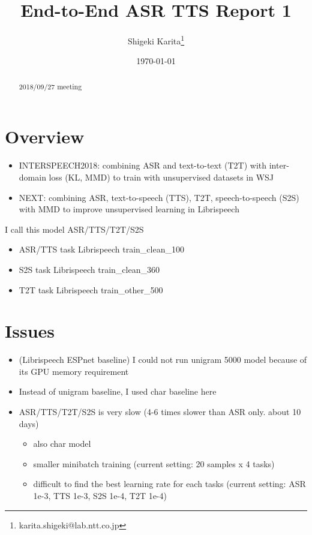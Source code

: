 \documentclass{ltjsarticle}
\author{Shigeki Karita\thanks{karita.shigeki@lab.ntt.co.jp}}
\date{\today}
\title{End-to-End ASR TTS Report 1}
\begin{document}
\maketitle
\begin{abstract}
2018/09/27 meeting
\end{abstract}

\section*{Overview}
\label{sec:orgd1881bf}

\begin{itemize}
\item INTERSPEECH2018: combining ASR and text-to-text (T2T) with inter-domain loss (KL, MMD) to train with unsupervised datasets in WSJ
\item NEXT: combining ASR, text-to-speech (TTS), T2T, speech-to-speech (S2S) with MMD to improve unsupervised learning in Librispeech
\end{itemize}

I call this model ASR/TTS/T2T/S2S

\begin{itemize}
\item ASR/TTS task Librispeech train\_clean\_100
\item S2S task Librispeech train\_clean\_360
\item T2T task Librispeech train\_other\_500
\end{itemize}

\section*{Issues}
\label{sec:orge4522f5}

\begin{itemize}
\item (Librispeech ESPnet baseline) I could not run unigram 5000 model because of its GPU memory requirement
\item Instead of unigram baseline, I used char baseline here
\item ASR/TTS/T2T/S2S is very slow (4-6 times slower than ASR only. about 10 days)
\begin{itemize}
\item also char model
\item smaller minibatch training (current setting: 20 samples x 4 tasks)
\item difficult to find the best learning rate for each tasks (current setting: ASR 1e-3, TTS 1e-3, S2S 1e-4, T2T 1e-4)
\end{itemize}
\end{itemize}
\end{document}

